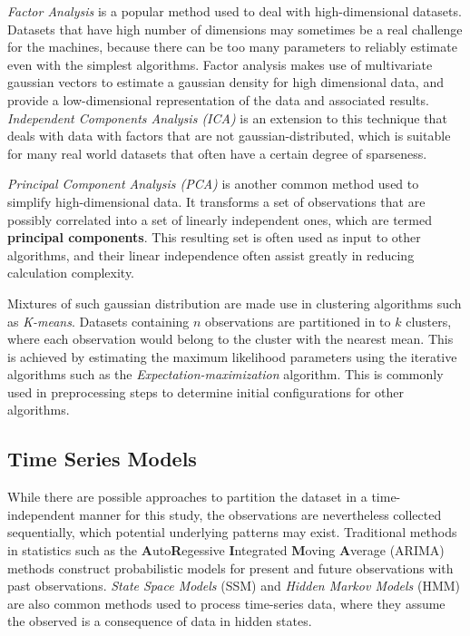 \documentclass[letterpaper, 10 pt, conference]{ieeeconf}  %
\begin{document}
\textit{Factor Analysis} is a popular method used to deal with high-dimensional datasets. Datasets that have high number of dimensions may sometimes be a real challenge for the machines, because there can be too many parameters to reliably estimate even with the simplest algorithms. Factor analysis makes use of multivariate gaussian vectors to estimate a gaussian density for high dimensional data, and provide a low-dimensional representation of the data and associated results. \textit{Independent Components Analysis (ICA)} is an extension to this technique that deals with data with factors that are not gaussian-distributed, which is suitable for many real world datasets that often have a certain degree of sparseness.

\textit{Principal Component Analysis (PCA)} is another common method used to simplify high-dimensional data. It transforms a set of observations that are possibly correlated into a set of linearly independent ones, which are termed \textbf{principal components}. This resulting set is often used as input to other algorithms, and their linear independence often assist greatly in reducing calculation complexity.

Mixtures of such gaussian distribution are made use in clustering algorithms such as \textit{K-means}. Datasets containing $n$ observations are partitioned in to $k$ clusters, where each observation would belong to the cluster with the nearest mean. This is achieved by estimating the maximum likelihood parameters using the iterative algorithms such as the \textit{Expectation-maximization} algorithm. This is commonly used in preprocessing steps to determine initial configurations for other algorithms.

\subsection*{Time Series Models}

While there are possible approaches to partition the dataset in a time-independent manner for this study, the observations are nevertheless collected sequentially, which potential underlying patterns may exist. Traditional methods in statistics such as the \textbf{A}uto\textbf{R}egessive \textbf{I}ntegrated \textbf{M}oving \textbf{A}verage (ARIMA) methods \cite{bontempi2012machine} construct probabilistic models for present and future observations with past observations. \textit{State Space Models} (SSM) and \textit{Hidden Markov Models} (HMM) are also common methods used to process time-series data, where they assume the observed is a consequence of data in hidden states. 
\end{document}
